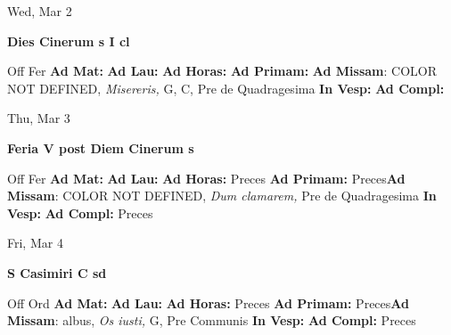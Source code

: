 \documentclass[10pt]{memoir}
\begin{document}
\begin{center}
\begin{minipage}{3.5in}
\vspace{2em}
\begin{center}Wed, Mar 2
\end{center}
\textbf{ \large Dies Cinerum
\textnormal{\normalsize s I cl}}

\begin{justify}Off Fer
\textbf{Ad Mat: }
\textbf{Ad Lau: }
\textbf{Ad Horas: }
\textbf{Ad Primam: }\textbf{Ad Missam}: COLOR NOT DEFINED, \textit{Misereris,} G, C, Pre de Quadragesima
\textbf{In Vesp: }
\textbf{Ad Compl: }
\end{justify}
\end{minipage}
\end{center}

\begin{center}
\begin{minipage}{3.5in}
\vspace{2em}
\begin{center}Thu, Mar 3
\end{center}
\textbf{ \large Feria V post Diem Cinerum
\textnormal{\normalsize s}}

\begin{justify}Off Fer
\textbf{Ad Mat: }
\textbf{Ad Lau: }
\textbf{Ad Horas: }Preces
\textbf{Ad Primam: }Preces\textbf{Ad Missam}: COLOR NOT DEFINED, \textit{Dum clamarem,} Pre de Quadragesima
\textbf{In Vesp: }
\textbf{Ad Compl: }Preces
\end{justify}
\end{minipage}
\end{center}

\begin{center}
\begin{minipage}{3.5in}
\vspace{2em}
\begin{center}Fri, Mar 4
\end{center}
\textbf{ \large S Casimiri C
\textnormal{\normalsize sd}}

\begin{justify}Off Ord
\textbf{Ad Mat: }
\textbf{Ad Lau: }
\textbf{Ad Horas: }Preces
\textbf{Ad Primam: }Preces\textbf{Ad Missam}: albus, \textit{Os iusti,} G, Pre Communis
\textbf{In Vesp: }
\textbf{Ad Compl: }Preces
\end{justify}
\end{minipage}
\end{center}
\end{document}
